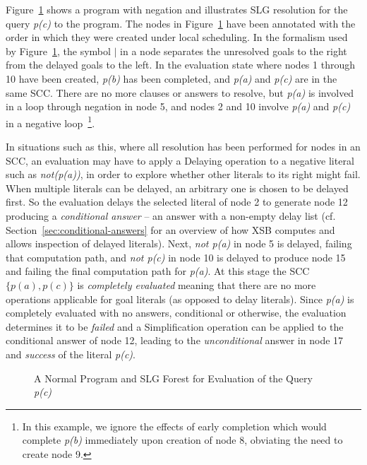 \begin{example} \label{ex:neg} \rm
Figure~\ref{fig:neg} shows a program with negation and illustrates SLG
resolution for the query {\em p(c)} to the program.  The nodes in
Figure~\ref{fig:neg} have been annotated with the order in which they
were created under local scheduling. In the formalism used by
Figure~\ref{fig:neg}, the symbol $|$ in a node separates the
unresolved goals to the right from the delayed goals to the left.  In
the evaluation state where nodes 1 through 10 have been created, {\em
  p(b)} has been completed, and {\em p(a)} and {\em p(c)} are in the
same SCC.  There are no more clauses or answers to resolve, but {\em
  p(a)} is involved in a loop through negation in node 5, and nodes 2
and 10 involve {\em p(a)} and {\em p(c)} in a negative
loop~\footnote{In this example, we ignore the effects of early
  completion which would complete {\em p(b)} immediately upon creation
  of node 8, obviating the need to create node 9.}.

In situations such as this, where all resolution has been performed
for nodes in an SCC, an evaluation may have to apply a {\sc Delaying}
operation to a negative literal such as {\em not(p(a))}, in order to
explore whether other literals to its right might fail. 
When multiple literals can be delayed, an arbitrary one is chosen to
be delayed first.  So the evaluation delays the selected literal of
node 2 to generate node 12 producing a {\em conditional answer} -- an
answer with a non-empty delay list
(cf. Section~\ref{sec:conditional-answers} for an overview of how XSB
computes and allows inspection of delayed literals).  Next, {\em not
  p(a)} in node 5 is delayed, failing that computation path, and {\em
  not p(c)} in node 10 is delayed to produce node 15 and failing the
final computation path for {\em p(a)}.  At this stage the SCC
$\{p(a),p(c)\}$ is {\em completely evaluated} meaning that there are
no more operations applicable for goal literals (as opposed to delay
literals).  Since {\em p(a)} is completely evaluated with no answers,
conditional or otherwise, the evaluation determines it to be {\em
  failed} and a {\sc Simplification} operation can be applied to the
conditional answer of node 12, leading to the {\em unconditional}
answer in node 17 and {\em success} of the literal {\em p(c)}.
\end{example}

\begin{figure}[tbp] 
\begin{center}
\end{center}
\caption{A Normal Program and SLG Forest for Evaluation of the Query {\em p(c)}}
\label{fig:neg}
\end{figure}


